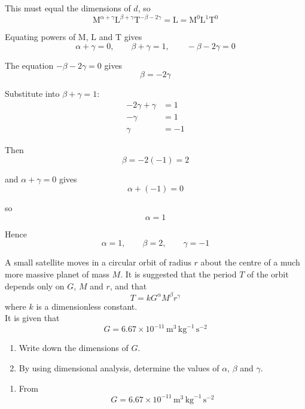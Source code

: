 \documentclass[leqno]{article}
\begin{document}
\begin{enumerate}[
  label=\textbf{\arabic*.},
  leftmargin=*,
  topsep=0pt,
  partopsep=0pt,
  parsep=0pt
]
\begin{djsSolution}
\begin{enumerate}[label=\textbf{(\alph*)}, start=1]
  This must equal the dimensions of $d$, so
  \[
  \mathrm{M}^{\alpha+\gamma}\mathrm{L}^{\beta+\gamma}\mathrm{T}^{-\beta-2\gamma}=\mathrm{L}=\mathrm{M^0L^1T^0}
  \]

  Equating powers of $\mathrm{M}$, $\mathrm{L}$ and $\mathrm{T}$ gives
  \[
  \alpha+\gamma=0,\qquad \beta+\gamma=1,\qquad -\beta-2\gamma=0
  \]

  The equation $-\beta-2\gamma=0$ gives
  \[
  \beta=-2\gamma
  \]

  Substitute into $\beta+\gamma=1$:
  \begin{align*}
  -2\gamma+\gamma&=1\\
  -\gamma&=1\\
  \gamma&=-1
  \end{align*}

  Then
  \[
  \beta=-2(-1)=2
  \]

  and $\alpha+\gamma=0$ gives
  \[
  \alpha+(-1)=0
  \]

  so
  \[
  \alpha=1
  \]

  Hence
  \[
  \alpha=1,\qquad \beta=2,\qquad \gamma=-1
  \]
\end{enumerate}
\end{djsSolution}


\newpage

\questionitem

A small satellite moves in a circular orbit of radius $r$ about the centre of a much more massive planet of mass $M$. It is suggested that the period $T$ of the orbit depends only on $G$, $M$ and $r$, and that
\[
T = kG^{\alpha} M^{\beta} r^{\gamma}
\]
where $k$ is a dimensionless constant. \\

It is given that
\[
G = 6.67 \times 10^{-11}\,\mathrm{m}^3\,\mathrm{kg}^{-1}\,\mathrm{s}^{-2}
\]
\begin{enumerate}[label=\textbf{(\alph*)}, start=1]
  \item Write down the dimensions of $G$.  \\
  \item By using dimensional analysis, determine the values of $\alpha$, $\beta$ and $\gamma$.  \\
\end{enumerate}

\vspace*{10pt}

\begin{djsSolution}
\begin{enumerate}[label=\textbf{(\alph*)}, start=1]
  \item From
  \[
  G=6.67\times 10^{-11}\,\mathrm{m}^3\,\mathrm{kg}^{-1}\,\mathrm{s}^{-2}
  \]


\end{enumerate}
\end{djsSolution}
\end{enumerate}
\end{document}
